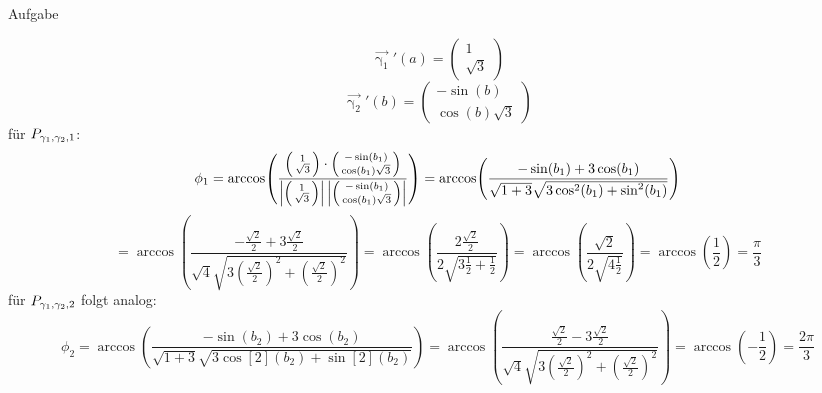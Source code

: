 \documentclass{scrartcl}
\begin{document}
\begin{section}{Aufgabe}
\begin{itemize}
\[\vec{\upgamma_1}'(a)=\begin{pmatrix}1\\\sqrt{3}\end{pmatrix}\]
\[\vec{\upgamma_2}'(b)=\begin{pmatrix}-\sin(b)\\\cos(b)\sqrt{3}\end{pmatrix}\]
für $P_{\gamma_1,\gamma_2,1}$:
\[\phi_1=\arccos(\frac{\begin{psmallmatrix}1\\\sqrt{3}\end{psmallmatrix}\cdot \begin{psmallmatrix}-\sin(b_1)\\\cos(b_1)\sqrt{3}\end{psmallmatrix}}{\left|\begin{psmallmatrix}1\\\sqrt{3}\end{psmallmatrix}\right|\left|\begin{psmallmatrix}-\sin(b_1)\\\cos(b_1)\sqrt{3}\end{psmallmatrix}\right|})
=\arccos(\frac{-\sin(b_1)+3\cos(b_1)}{\sqrt{1+3} \sqrt{3 \cos[2](b_1)+\sin[2](b_1)}})\]
\[=\arccos(\frac{-\frac{\sqrt{2}}{2}+3\frac{\sqrt{2}}{2}}{\sqrt{4} \sqrt{3 (\frac{\sqrt{2}}{2})^2+(\frac{\sqrt{2}}{2})^2}})=
\arccos(\frac{2\frac{\sqrt{2}}{2}}{2 \sqrt{3 \frac{1}{2}+\frac{1}{2}}})
=\arccos(\frac{\sqrt{2}}{2 \sqrt{4\frac{1}{2}}})
=\arccos(\frac{1}{2})=\frac{\pi}{3}\]
für $P_{\gamma_1,\gamma_2,2}$ folgt analog:
\[\phi_2=\arccos(\frac{-\sin(b_2)+3\cos(b_2)}{\sqrt{1+3} \sqrt{3 \cos[2](b_2)+\sin[2](b_2)}})
=\arccos(\frac{\frac{\sqrt{2}}{2}-3\frac{\sqrt{2}}{2}}{\sqrt{4} \sqrt{3 (\frac{\sqrt{2}}{2})^2+(\frac{\sqrt{2}}{2})^2}})
=\arccos(-\frac{1}{2})=\frac{2\pi}{3}\]


\end{itemize}
\end{section}
\end{document}
